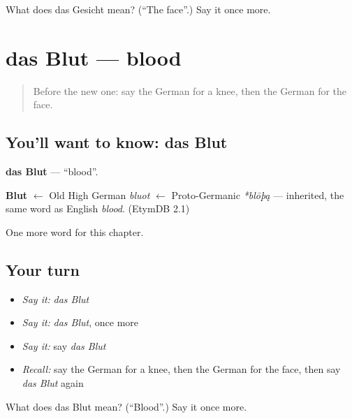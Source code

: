 \begin{tcolorbox}[breakable,colback=teal!4,colframe=teal!35!black,title={Before you move on}]
What does das Gesicht mean? (\textquotedblleft{}The face\textquotedblright{}.) Say it once more.
\end{tcolorbox}
\section[das Blut]{das Blut — blood}

\label{lesson:GE-C57-blut}



\begin{quote}
Before the new one: say the German for a knee, then the German for the face.
\end{quote}

\subsection*{You'll want to know: das Blut}
\textbf{das Blut} — \textquotedblleft{}blood\textquotedblright{}.

\begin{cousinweb}
\textbf{Blut} $\leftarrow$ Old High German \emph{bluot} $\leftarrow$ Proto-Germanic \emph{*blōþą} — inherited, the same word as English \emph{blood}. (EtymDB 2.1)
\end{cousinweb}

\begin{grammarlens}[title={What you've built}]
One more word for this chapter.
\end{grammarlens}

\subsection*{Your turn}
\begin{itemize}
\raggedright
  \item \emph{Say it:} \emph{das Blut}
  \item \emph{Say it:} \emph{das Blut}, once more
  \item \emph{Say it:} say \emph{das Blut}
  \item \emph{Recall:} say the German for a knee, then the German for the face, then say \emph{das Blut} again
\end{itemize}

\begin{tcolorbox}[breakable,colback=teal!4,colframe=teal!35!black,title={Before you move on}]
What does das Blut mean? (\textquotedblleft{}Blood\textquotedblright{}.) Say it once more.
\end{tcolorbox}
